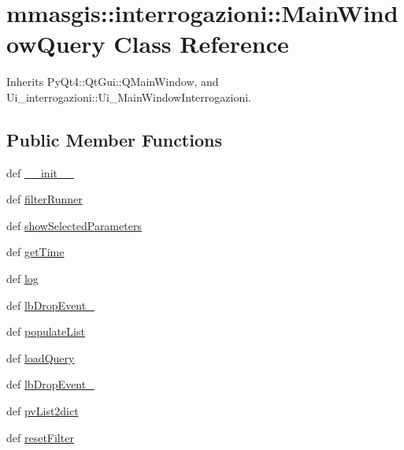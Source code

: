 \hypertarget{classmmasgis_1_1interrogazioni_1_1MainWindowQuery}{
\section{mmasgis::interrogazioni::MainWindowQuery Class Reference}
\label{classmmasgis_1_1interrogazioni_1_1MainWindowQuery}
}


Inherits PyQt4::QtGui::QMainWindow, and Ui\_\-interrogazioni::Ui\_\-MainWindowInterrogazioni.

\subsection*{Public Member Functions}
\begin{DoxyCompactItemize}
\item 
def \hyperlink{classmmasgis_1_1interrogazioni_1_1MainWindowQuery_af8ffb2b88ef13dcde5750edc7dfa7d75}{\_\-\_\-init\_\-\_\-}
\item 
def \hyperlink{classmmasgis_1_1interrogazioni_1_1MainWindowQuery_a66024493352e266f4590ae3fa74c20a7}{filterRunner}
\item 
def \hyperlink{classmmasgis_1_1interrogazioni_1_1MainWindowQuery_a69144ac9b951b5c699cfed66189bf03c}{showSelectedParameters}
\item 
def \hyperlink{classmmasgis_1_1interrogazioni_1_1MainWindowQuery_a5592b11139dede6f29892106b15a2a2d}{getTime}
\item 
def \hyperlink{classmmasgis_1_1interrogazioni_1_1MainWindowQuery_a404fcac49e18ca45f613fd29729eba59}{log}
\item 
def \hyperlink{classmmasgis_1_1interrogazioni_1_1MainWindowQuery_a1f96f10cb1293cfd8f2803baf0f21940}{lbDropEvent\_}
\item 
def \hyperlink{classmmasgis_1_1interrogazioni_1_1MainWindowQuery_aca7bf8e3613213ee72ab704a5f550c9d}{populateList}
\item 
def \hyperlink{classmmasgis_1_1interrogazioni_1_1MainWindowQuery_a7fc4ff31764bc3da4701cf6d4403c2e2}{loadQuery}
\item 
def \hyperlink{classmmasgis_1_1interrogazioni_1_1MainWindowQuery_a7038a3590db95afa28b3833f0b16fd5e}{lbDropEvent\_}
\item 
def \hyperlink{classmmasgis_1_1interrogazioni_1_1MainWindowQuery_af1f83352a05aa575ca96b27dad55eb8d}{pvList2dict}
\item 
def \hyperlink{classmmasgis_1_1interrogazioni_1_1MainWindowQuery_aaa5401d2dd9083167055d23839527f46}{resetFilter}

\end{DoxyCompactItemize}
